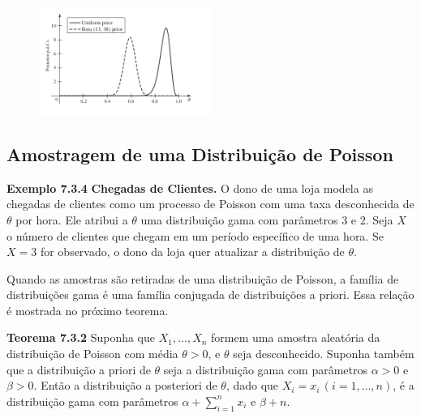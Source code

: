 \vspace{1cm}
\begin{figure}[H]

\centering

\includegraphics[width=0.5\textwidth]{img/7_3/img_1.png}

\end{figure}\vspace{1cm}

\subsection*{Amostragem de uma Distribuição de Poisson}

\noindent\textbf{Exemplo 7.3.4} \quad \textbf{Chegadas de Clientes.} O dono de uma loja modela as chegadas de clientes como um processo de Poisson com uma taxa desconhecida de $\theta$ por hora. Ele atribui a $\theta$ uma distribuição gama com parâmetros 3 e 2. Seja $X$ o número de clientes que chegam em um período específico de uma hora. Se $X=3$ for observado, o dono da loja quer atualizar a distribuição de $\theta$.

\vspace{1cm}
Quando as amostras são retiradas de uma distribuição de Poisson, a família de distribuições gama é uma família conjugada de distribuições a priori. Essa relação é mostrada no próximo teorema.

\vspace{1cm}
\noindent\textbf{Teorema 7.3.2} \quad Suponha que $X_1, \dots, X_n$ formem uma amostra aleatória da distribuição de Poisson com média $\theta > 0$, e $\theta$ seja desconhecido. Suponha também que a distribuição a priori de $\theta$ seja a distribuição gama com parâmetros $\alpha > 0$ e $\beta > 0$. Então a distribuição a posteriori de $\theta$, dado que $X_i=x_i \, (i=1, \dots, n)$, é a distribuição gama com parâmetros $\alpha + \sum_{i=1}^{n}x_i$ e $\beta + n$.

